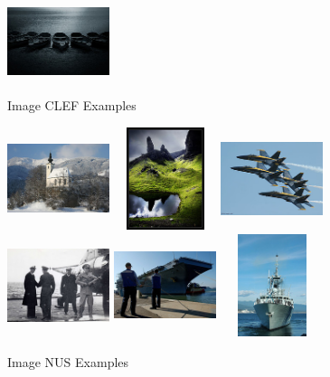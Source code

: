 \begin{center}
\begin{figure}
\includegraphics[width=3cm, height=3cm]{./Pictures/CLEF/6.jpg}
\caption{Image CLEF Examples}
\label{fig:Image CLEF Examples}
\end{figure}
\end{center}
\vspace*{1cm}
\begin{center}
\begin{figure}
\centering
\includegraphics[width=3cm, height=3cm]{./Pictures/NUS/1.jpg}
\includegraphics[width=3cm, height=3cm]{./Pictures/NUS/2.jpg}
\includegraphics[width=3cm, height=3cm]{./Pictures/NUS/3.jpg} \\
\includegraphics[width=3cm, height=3cm]{./Pictures/NUS/4.jpg}
\includegraphics[width=3cm, height=3cm]{./Pictures/NUS/5.jpg}
\includegraphics[width=3cm, height=3cm]{./Pictures/NUS/6.jpg}
\caption{Image NUS Examples}
\label{fig:Image NUS Examples}
\end{figure}
\end{center}
